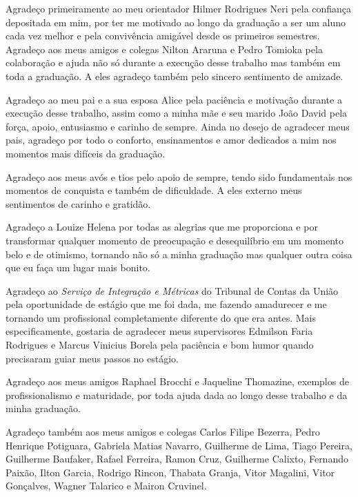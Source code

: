 \begin{agradecimentos}

Agradeço primeiramente ao meu orientador Hilmer Rodrigues Neri pela confiança depositada em mim, por ter me motivado ao longo da graduação a ser um aluno cada vez melhor e pela convivência amigável desde os primeiros semestres. Agradeço aos meus amigos e colegas Nilton Araruna e Pedro Tomioka pela colaboração e ajuda não só durante a execução desse trabalho mas também em toda a graduação. A eles agradeço também pelo sincero sentimento de amizade.

Agradeço ao meu pai e a sua esposa Alice pela paciência e motivação durante a execução desse trabalho, assim como a minha mãe e seu marido João David pela força, apoio, entusiasmo e carinho de sempre. Ainda no desejo de agradecer meus pais, agradeço por todo o conforto, ensinamentos e amor dedicados a mim nos momentos mais difíceis da graduação.

Agradeço aos meus avós e tios pelo apoio de sempre, tendo sido fundamentais nos momentos de conquista e também de dificuldade. A eles externo meus sentimentos de carinho e gratidão.

Agradeço a Louize Helena por todas as alegrias que me proporciona e por transformar qualquer momento de preocupação e desequilíbrio em um momento belo e de otimismo, tornando não só a minha graduação mas qualquer outra coisa que eu faça um lugar mais bonito. 

Agradeço ao \textit{Serviço de Integração e Métricas} do Tribunal de Contas da União pela oportunidade de estágio que me foi dada, me fazendo amadurecer e me tornando um profissional completamente diferente do que era antes. Mais especificamente, gostaria de agradecer meus supervisores Edmilson Faria Rodrigues e Marcus Vinicius Borela pela paciência e bom humor quando precisaram guiar meus passos no estágio.

Agradeço aos meus amigos Raphael Brocchi e Jaqueline Thomazine, exemplos de profissionalismo e maturidade, por toda ajuda dada ao longo desse trabalho e da minha graduação. 

Agradeço também aos meus amigos e colegas Carlos Filipe Bezerra, Pedro Henrique Potiguara, Gabriela Matias Navarro, Guilherme de Lima, Tiago Pereira, Guilherme Baufaker, Rafael Ferreira, Ramon Cruz, Guilherme Calixto, Fernando Paixão, Ilton Garcia, Rodrigo Rincon, Thabata Granja, Vitor Magalini, Vitor Gonçalves, Wagner Talarico e Mairon Cruvinel. 


\end{agradecimentos}
